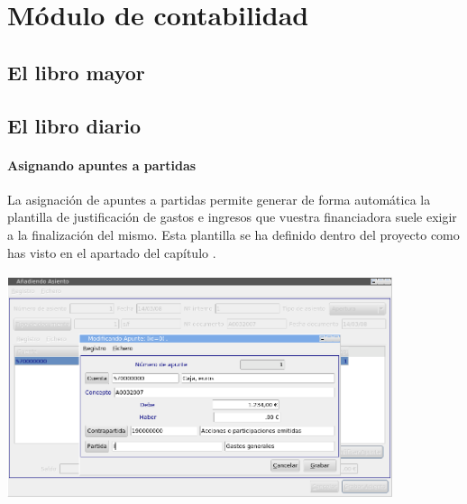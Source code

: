 \chapter{Módulo de contabilidad}
\label{ref:capituloV}\section{El libro mayor}
\section{El libro diario}
\subsubsection{Asignando apuntes a partidas}
\label{ref:asignarapuntepartida}La asignación de apuntes a partidas
permite generar de forma automática la plantilla de justificación
de gastos e ingresos que vuestra financiadora suele exigir a la
finalización del mismo. Esta plantilla se ha definido dentro del
proyecto como has visto en el apartado  del capítulo .



\begin{center}
\includegraphics[width=11.299cm,height=6.606cm]{manual-img23.png}
\end{center}

\bigskip


\bigskip


\bigskip


\bigskip


\bigskip


\bigskip


\bigskip


\bigskip


\bigskip


\bigskip


\bigskip

